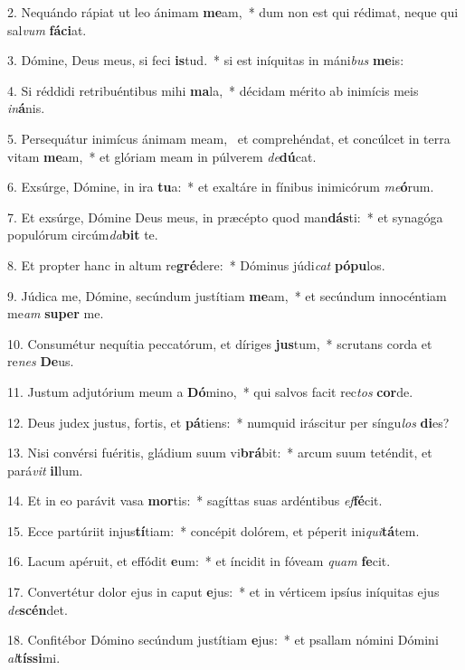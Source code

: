 2. Nequándo rápiat ut leo ánimam \textbf{me}am,~*  dum non est qui rédimat, neque qui sal\textit{vum} \textbf{fá}\textbf{ci}at.\

3. Dómine, Deus meus, si feci \textbf{is}tud.~*  si est iníquitas in máni\textit{bus} \textbf{me}is:\

4. Si réddidi retribuéntibus mihi \textbf{ma}la,~*  décidam mérito ab inimícis meis \textit{in}\textbf{á}nis.\

5. Persequátur inimícus ánimam meam, \dag\  et comprehéndat, et concúlcet in terra vitam \textbf{me}am,~*  et glóriam meam in púlverem \textit{de}\textbf{dú}cat.\

6. Exsúrge, Dómine, in ira \textbf{tu}a:~*  et exaltáre in fínibus inimicórum \textit{me}\textbf{ó}rum.\

7. Et exsúrge, Dómine Deus meus, in præcépto quod man\textbf{dás}ti:~*  et synagóga populórum circúm\textit{da}\textbf{bit} te.\

8. Et propter hanc in altum re\textbf{gré}dere:~*  Dóminus júdi\textit{cat} \textbf{pó}\textbf{pu}los.\

9. Júdica me, Dómine, secúndum justítiam \textbf{me}am,~*  et secúndum innocéntiam me\textit{am} \textbf{su}\textbf{per} me.\

10. Consumétur nequítia peccatórum, et díriges \textbf{jus}tum,~*  scrutans corda et re\textit{nes} \textbf{De}us.\

11. Justum adjutórium meum a \textbf{Dó}mino,~*  qui salvos facit rec\textit{tos} \textbf{cor}de.\

12. Deus judex justus, fortis, et \textbf{pá}tiens:~*  numquid iráscitur per síngu\textit{los} \textbf{di}es?\

13. Nisi convérsi fuéritis, gládium suum vi\textbf{brá}bit:~*  arcum suum teténdit, et pará\textit{vit} \textbf{il}lum.\

14. Et in eo parávit vasa \textbf{mor}tis:~*  sagíttas suas ardéntibus \textit{ef}\textbf{fé}cit.\

15. Ecce partúriit injus\textbf{tí}tiam:~*  concépit dolórem, et péperit ini\textit{qui}\textbf{tá}tem.\

16. Lacum apéruit, et effódit \textbf{e}um:~*  et íncidit in fóveam \textit{quam} \textbf{fe}cit.\

17. Convertétur dolor ejus in caput \textbf{e}jus:~*  et in vérticem ipsíus iníquitas ejus \textit{de}\textbf{scén}det.\

18. Confitébor Dómino secúndum justítiam \textbf{e}jus:~*  et psallam nómini Dómini \textit{al}\textbf{tís}\textbf{si}mi.\

